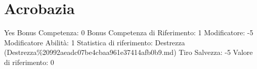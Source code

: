 \section{Acrobazia}\label{acrobazia}

\begin{description}
\tightlist
\item[Tags: ABI]
Yes Bonus Competenza: 0 Bonus Competenza di Riferimento: 1 Modificatore:
-5 Modificatore Abilità: 1 Statistica di riferimento: Destrezza
(Destrezza\%20992aeadc07be4cbaa961e37414afb0b9.md) Tiro Salvezza: -5
Valore di riferimento: 0
\end{description}
